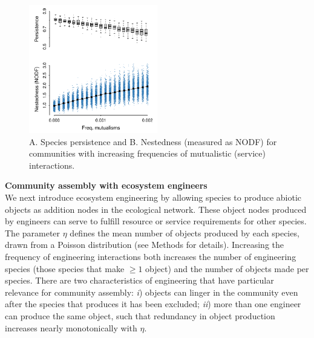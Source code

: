 \documentclass[9pt,twocolumn,twoside]{pnas-new}
\begin{document}
\begin{figure}
\centering
\includegraphics[width=0.5\textwidth]{fig_nested.pdf}
\caption{
A. Species persistence and
B. Nestedness (measured as NODF) for communities with increasing frequencies of mutualistic (service) interactions.
}
\label{fig:nest}
\end{figure}

\noindent \textbf{Community assembly with ecosystem engineers} \\
We next introduce ecosystem engineering by allowing species to produce abiotic objects as addition nodes in the ecological network.
These object nodes produced by engineers can serve to fulfill resource or service requirements for other species.
The parameter $\eta$ defines the mean number of objects produced by each species, drawn from a Poisson distribution (see Methods for details).
Increasing the frequency of engineering interactions both increases the number of engineering species (those species that make $\geq 1$ object) and the number of objects made per species.
There are two characteristics of engineering that have particular relevance for community assembly:
\emph{i}) objects can linger in the community even after the species that produces it has been excluded;
\emph{ii}) more than one engineer can produce the same object, such that redundancy in object production increases nearly monotonically with $\eta$.
\end{document}
